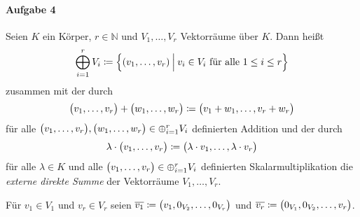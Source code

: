 \documentclass{scrreprt}
\begin{document}
\paragraph{Aufgabe 4} Seien $K$ ein Körper, $r \in \mathbb{N}$ und
$V_1, \ldots, V_r$ Vektorräume über $K$.
Dann heißt
\[
  \bigoplus_{i = 1}^r V_i \coloneqq \qty{
    \qty(v_1, \ldots, v_r) \:{\Big |}\:
    v_i \in V_i \text{ für alle $1 \leq i \leq r$}
  }
\]
zusammen mit der durch
\[
  \qty\big(v_1, \ldots, v_r) + \qty\big(w_1, \ldots, w_r) \coloneqq
  \qty\big(v_1 + w_1, \ldots, v_r + w_r)
\]
für alle $\qty\big(v_1, \ldots, v_r), \qty\big(w_1, \ldots, w_r) \in
\oplus_{i = 1}^r V_i$ definierten Addition und der durch
\[
  \lambda \cdot \qty\big(v_1, \ldots, v_r) \coloneqq
  \qty\big(\lambda \cdot v_1, \ldots, \lambda \cdot v_r)
\]
für alle $\lambda \in K$ und alle
$\qty\big(v_1, \ldots, v_r) \in \oplus_{i = 1}^r V_i$ definierten
Skalarmultiplikation die \emph{externe direkte Summe} der Vektorräume
$V_1, \ldots, V_r$.

\noindent
Für $v_1 \in V_1$ und $v_r \in V_r$ seien
$\overline{v_1} \coloneqq \qty\big(v_1, 0_{V_2}, \ldots, 0_{V_r})$
und
$\overline{v_r} \coloneqq \qty\big(0_{V_1}, 0_{V_2}, \ldots, v_r)$.
\end{document}

